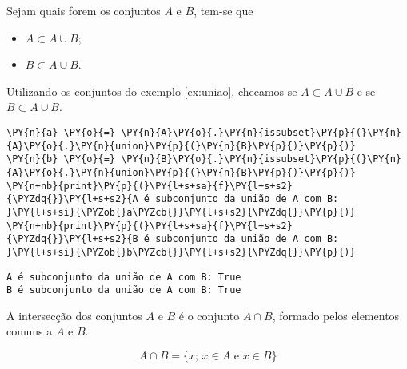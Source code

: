 \documentclass{book}
\begin{document}
        Sejam quais forem os conjuntos $A$ e $B$, tem-se que

        \begin{itemize}
            \item $A \subset A \cup B$;
            \item $B \subset A \cup B$.
        \end{itemize}

        \begin{exemplo}
            Utilizando os conjuntos do exemplo \ref{ex:uniao}, checamos se $A \subset A \cup B$ e se $B \subset A \cup B$.


\begin{Verbatim}[commandchars=\\\{\},frame=single,fontsize=\small, xleftmargin=0.5em]
\PY{n}{a} \PY{o}{=} \PY{n}{A}\PY{o}{.}\PY{n}{issubset}\PY{p}{(}\PY{n}{A}\PY{o}{.}\PY{n}{union}\PY{p}{(}\PY{n}{B}\PY{p}{)}\PY{p}{)}
\PY{n}{b} \PY{o}{=} \PY{n}{B}\PY{o}{.}\PY{n}{issubset}\PY{p}{(}\PY{n}{A}\PY{o}{.}\PY{n}{union}\PY{p}{(}\PY{n}{B}\PY{p}{)}\PY{p}{)}
\PY{n+nb}{print}\PY{p}{(}\PY{l+s+sa}{f}\PY{l+s+s2}{\PYZdq{}}\PY{l+s+s2}{A é subconjunto da união de A com B: }\PY{l+s+si}{\PYZob{}a\PYZcb{}}\PY{l+s+s2}{\PYZdq{}}\PY{p}{)}
\PY{n+nb}{print}\PY{p}{(}\PY{l+s+sa}{f}\PY{l+s+s2}{\PYZdq{}}\PY{l+s+s2}{B é subconjunto da união de A com B: }\PY{l+s+si}{\PYZob{}b\PYZcb{}}\PY{l+s+s2}{\PYZdq{}}\PY{p}{)}
\end{Verbatim}

\begin{Verbatim}[commandchars=\\\{\},frame=leftline,fontsize=\small, xleftmargin=0.5em]
A é subconjunto da união de A com B: True
B é subconjunto da união de A com B: True
\end{Verbatim}

        \end{exemplo}

        A intersecção dos conjuntos $A$ e $B$ é o conjunto $A \cap B$, formado pelos elementos comuns a $A$ e $B$.

        $$ A \cap B = \{x \text{; } x \in A \text{ e } x \in B\}$$
\end{document}
